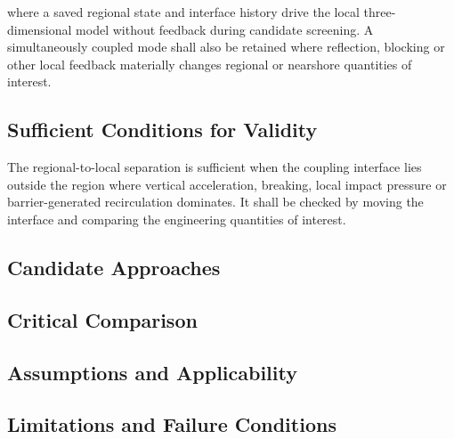 where a saved regional state and interface history drive the local
three-dimensional model without feedback during candidate screening.
A simultaneously coupled mode shall also be retained where reflection,
blocking or other local feedback materially changes regional or
nearshore quantities of interest.

\subsection{Sufficient Conditions for Validity}
\label{sec:res-mod-sys-sufficient-conditions-validity}


The regional-to-local separation is sufficient when the coupling
interface lies outside the region where vertical acceleration,
breaking, local impact pressure or barrier-generated recirculation
dominates. It shall be checked by moving the interface and comparing
the engineering quantities of interest.

\subsection{Candidate Approaches}
\label{sec:res-mod-sys-candidate-approaches}


\subsection{Critical Comparison}
\label{sec:res-mod-sys-critical-comparison}


\subsection{Assumptions and Applicability}
\label{sec:res-mod-sys-assumptions}


\subsection{Limitations and Failure Conditions}
\label{sec:res-mod-sys-limitations}


